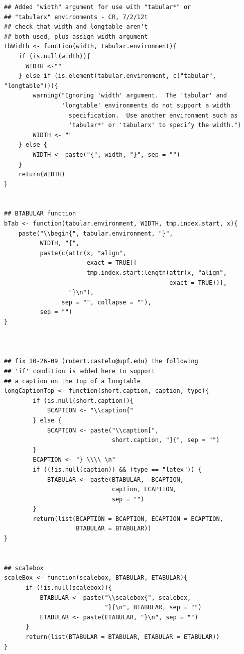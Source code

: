 \documentclass{memoir}\usepackage[]{graphicx}\usepackage[]{color}
\begin{document}
\begin{lstlisting}
## Added "width" argument for use with "tabular*" or
## "tabularx" environments - CR, 7/2/12t
## check that width and longtable aren't
## both used, plus assign width argument
tbWidth <- function(width, tabular.environment){
    if (is.null(width)){
      WIDTH <-""
    } else if (is.element(tabular.environment, c("tabular", "longtable"))){
        warning("Ignoring 'width' argument.  The 'tabular' and 
                'longtable' environments do not support a width 
                  specification.  Use another environment such as 
                  'tabular*' or 'tabularx' to specify the width.")
        WIDTH <- ""
    } else {
        WIDTH <- paste("{", width, "}", sep = "")
    }
    return(WIDTH)
}


## BTABULAR function
bTab <- function(tabular.environment, WIDTH, tmp.index.start, x){
    paste("\\begin{", tabular.environment, "}",
          WIDTH, "{",
          paste(c(attr(x, "align",
                       exact = TRUE)[
                       tmp.index.start:length(attr(x, "align",
                                              exact = TRUE))],
                  "}\n"),
                sep = "", collapse = ""),
          sep = "")
}



## fix 10-26-09 (robert.castelo@upf.edu) the following
## 'if' condition is added here to support
## a caption on the top of a longtable
longCaptionTop <- function(short.caption, caption, type){
        if (is.null(short.caption)){
            BCAPTION <- "\\caption{"
        } else {
            BCAPTION <- paste("\\caption[", 
                              short.caption, "]{", sep = "")
        }
        ECAPTION <- "} \\\\ \n"
        if ((!is.null(caption)) && (type == "latex")) {
            BTABULAR <- paste(BTABULAR,  BCAPTION, 
                              caption, ECAPTION,
                              sep = "")
        }
        return(list(BCAPTION = BCAPTION, ECAPTION = ECAPTION, 
                    BTABULAR = BTABULAR))
}


## scalebox
scaleBox <- function(scalebox, BTABULAR, ETABULAR){
      if (!is.null(scalebox)){
          BTABULAR <- paste("\\scalebox{", scalebox, 
                            "}{\n", BTABULAR, sep = "")
          ETABULAR <- paste(ETABULAR, "}\n", sep = "")
      }
      return(list(BTABULAR = BTABULAR, ETABULAR = ETABULAR))
}


\end{lstlisting}
\end{document}
